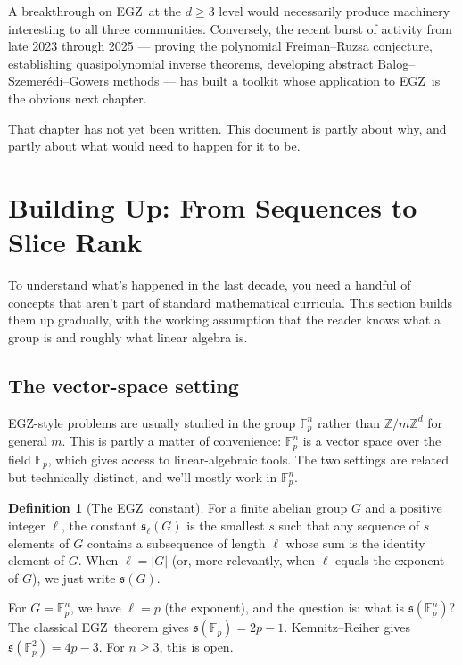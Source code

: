 \documentclass[11pt,a4paper]{article}
\theoremstyle{plain}
\theoremstyle{definition}
\newtheorem{definition}[theorem]{Definition}
\theoremstyle{remark}
\newcommand{\F}{\mathbb{F}}
\newcommand{\Z}{\mathbb{Z}}
\newcommand{\sUFp}{\mathfrak{s}}
\newcommand{\EGZ}{\textsf{EGZ}}
\begin{document}
A breakthrough on \EGZ\ at the $d \geq 3$ level would necessarily produce machinery interesting to all three communities. Conversely, the recent burst of activity from late 2023 through 2025 --- proving the polynomial Freiman--Ruzsa conjecture, establishing quasipolynomial inverse theorems, developing abstract Balog--Szemer\'edi--Gowers methods --- has built a toolkit whose application to \EGZ\ is the obvious next chapter.

That chapter has not yet been written. This document is partly about why, and partly about what would need to happen for it to be.

\section{Building Up: From Sequences to Slice Rank}

To understand what's happened in the last decade, you need a handful of concepts that aren't part of standard mathematical curricula. This section builds them up gradually, with the working assumption that the reader knows what a group is and roughly what linear algebra is.

\subsection{The vector-space setting}

\EGZ-style problems are usually studied in the group $\F_p^n$ rather than $\Z/m\Z^d$ for general $m$. This is partly a matter of convenience: $\F_p^n$ is a vector space over the field $\F_p$, which gives access to linear-algebraic tools. The two settings are related but technically distinct, and we'll mostly work in $\F_p^n$.

\begin{definition}[The \EGZ\ constant]
For a finite abelian group $G$ and a positive integer $\ell$, the constant $\sUFp_\ell(G)$ is the smallest $s$ such that any sequence of $s$ elements of $G$ contains a subsequence of length $\ell$ whose sum is the identity element of $G$. When $\ell = |G|$ (or, more relevantly, when $\ell$ equals the exponent of $G$), we just write $\sUFp(G)$.
\end{definition}

For $G = \F_p^n$, we have $\ell = p$ (the exponent), and the question is: what is $\sUFp(\F_p^n)$? The classical \EGZ\ theorem gives $\sUFp(\F_p) = 2p - 1$. Kemnitz--Reiher gives $\sUFp(\F_p^2) = 4p - 3$. For $n \geq 3$, this is open.
\end{document}
